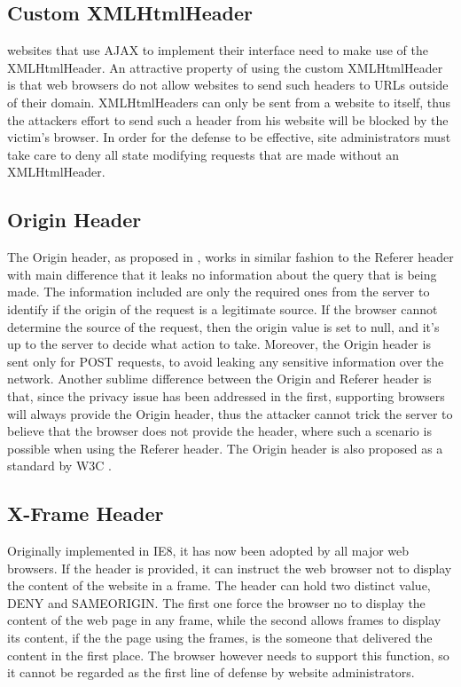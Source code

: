 \subsection{Custom XMLHtmlHeader}
websites that use AJAX to implement their interface need to make use of the XMLHtmlHeader.  An attractive property of
using the custom XMLHtmlHeader is that web browsers do not allow websites to send such headers to URLs outside of their
domain.  XMLHtmlHeaders can only be sent from a website to itself, thus the attackers effort to send such a header from
his website will be blocked by the victim's browser.  In order for the defense to be effective, site administrators must
take care to deny all state modifying requests that are made without an XMLHtmlHeader.

\subsection{Origin Header}
The Origin header, as proposed in \cite{Barth:2008:RDC:1455770.1455782}, works in similar fashion to the Referer header with
main difference that it leaks no information about the query that is being made.  The information included are only the required
ones from the server to identify if the origin of the request is a legitimate source.  If the browser cannot determine the
source of the request, then the origin value is set to null, and it's up to the server to decide what action to take.  
Moreover, the Origin header  is sent only for POST requests, to avoid leaking any sensitive information over the network.
Another sublime difference between the Origin and Referer header is that, since the privacy issue has been addressed in
the first, supporting browsers will always provide the Origin header, thus the attacker cannot trick the server to believe
that the browser does not provide the header, where such a scenario is possible when using the Referer header.  The Origin
header is also proposed as a standard by W3C \cite{website:w3c-cors}. 

\subsection{X-Frame Header}
Originally implemented in IE8, it has now been adopted by all major web browsers.  If the header is provided, it can
instruct the web browser not to display the content of the website in a frame.  The header can hold two distinct value,
DENY and SAMEORIGIN.  The first one force the browser no to display the content of the web page in any frame, while the
second allows frames to display its content,  if the the page using the frames, is the someone that delivered the content
in the first place.  The browser however needs to support this function, so it cannot be regarded as the first line of
defense by website administrators.

